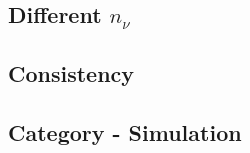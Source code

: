 \documentclass[Research_Module_ES.tex]{subfiles}
\begin{document}
\subsection{Different $n_{\nu}$}


\subsection{Consistency}

\subsection{Category  - Simulation}
\end{document}
